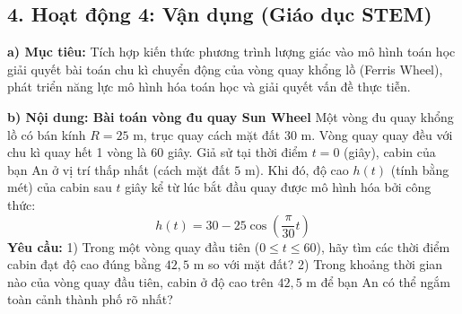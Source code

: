 \documentclass[12pt, a4paper]{article}
\begin{document}
\subsection*{4. Hoạt động 4: Vận dụng (Giáo dục STEM)}  
  
\noindent \textbf{a) Mục tiêu:}  
Tích hợp kiến thức phương trình lượng giác vào mô hình toán học giải quyết bài toán chu kì chuyển động của vòng quay khổng lồ (Ferris Wheel), phát triển năng lực mô hình hóa toán học và giải quyết vấn đề thực tiễn.  
  
\noindent \textbf{b) Nội dung: Bài toán vòng đu quay Sun Wheel}  
Một vòng đu quay khổng lồ có bán kính $R = 25\text{ m}$, trục quay cách mặt đất $30\text{ m}$. Vòng quay quay đều với chu kì quay hết 1 vòng là 60 giây. Giả sử tại thời điểm $t = 0$ (giây), cabin của bạn An ở vị trí thấp nhất (cách mặt đất $5\text{ m}$).  
Khi đó, độ cao $h(t)$ (tính bằng mét) của cabin sau $t$ giây kể từ lúc bắt đầu quay được mô hình hóa bởi công thức:  
$$h(t) = 30 - 25\cos\left(\dfrac{\pi}{30}t\right)$$  
\textbf{Yêu cầu:}  
1) Trong một vòng quay đầu tiên ($0 \le t \le 60$), hãy tìm các thời điểm cabin đạt độ cao đúng bằng $42{,}5\text{ m}$ so với mặt đất?  
2) Trong khoảng thời gian nào của vòng quay đầu tiên, cabin ở độ cao trên $42{,}5\text{ m}$ để bạn An có thể ngắm toàn cảnh thành phố rõ nhất?  
  
\end{document}
